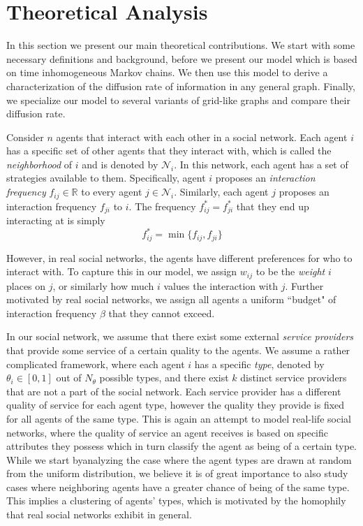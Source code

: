 \documentclass[format=acmsmall, review=false]{acmart}
\begin{document}
\section{Theoretical Analysis}

\par In this section we present our main theoretical contributions. We start with some necessary definitions and background,
before we present our model which is based on time inhomogeneous Markov chains. We then use this model to derive a
characterization of the diffusion rate of information in any general graph. Finally, we specialize our model to several
variants of grid-like graphs and compare their diffusion rate.

\par Consider $n$ agents that interact with each other in a social network. Each agent $i$ has a specific set of other agents
that they interact with, which is called the \textit{neighborhood} of $i$ and is denoted by $\mathcal{N}_i$. In this network,
each agent has a set of strategies available to them. Specifically, agent $i$ proposes an \textit{interaction frequency}
$f_{ij} \in \mathbb{R}$ to every agent $j \in \mathcal{N}_i$. Similarly, each agent $j$ proposes an
interaction frequency $f_{ji}$ to $i$. The frequency $f^*_{ij} = f^*_{ji}$ that they end up interacting at is simply
\[
f^*_{ij} = \min { \{ f_{ij}, f_{ji} \} }
\]

\par However, in real social networks, the agents have different preferences for who to interact with. To capture this
in our model, we assign $w_{ij}$ to be the \textit{weight} $i$ places on $j$, or similarly how much $i$ values the interaction
with $j$. Further motivated by real social networks, we assign all agents a uniform ``budget" of interaction frequency $\beta$
that they cannot exceed.

\par In our social network, we assume that there exist some external \textit{service providers} that provide some service of a
certain quality to the agents. We assume a rather complicated framework, where each agent $i$ has a specific \textit{type},
denoted by $\theta_i \in [0, 1]$ out of $N_\theta$ possible types, and there exist $k$ distinct service providers that are not a
part of the social network. Each service provider has a different quality of service for each agent type, however the quality they
provide is fixed for all agents of the same type. This is again an attempt to model real-life social networks, where the quality
of service an agent receives is based on specific attributes they possess which in turn classify the agent as being of a certain
type. While we start byanalyzing the case where the agent types are drawn at random from the uniform distribution, we believe it
is of great importance to also study cases where neighboring agents have a greater chance of being of the same type. This implies
a clustering of agents' types, which is motivated by the homophily that real social networks exhibit in general.
\end{document}

